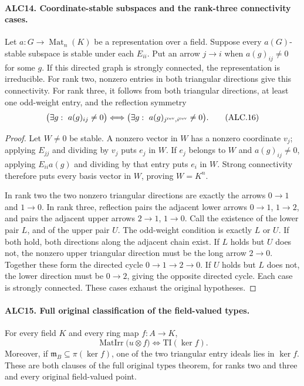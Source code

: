 \documentclass[11pt,a4paper]{article}
\numberwithin{equation}{section}
\theoremstyle{remark}\newtheorem{remark}[theorem]{Remark}
\begin{document}
\paragraph{ALC14. Coordinate-stable subspaces and the rank-three connectivity cases.}
\label{claim:ALC14}
Let \(a:G\to\operatorname{Mat}_n(K)\) be a representation
over a field.  Suppose every \(a(G)\)-stable subspace is
stable under each \(E_{ii}\).  Put an arrow \(j\to i\)
when \(a(g)_{ij}\ne0\) for some \(g\).  If this directed
graph is strongly connected, the representation is irreducible.
For rank two, nonzero entries in both triangular directions
give this connectivity.  For rank three, it follows from
both triangular directions, at least one odd-weight entry,
and the reflection symmetry
\[
 \bigl(\exists g:\ a(g)_{ij}\ne0\bigr)
 \Longleftrightarrow
 \bigl(\exists g:\ a(g)_{j^{\rm rev},i^{\rm rev}}\ne0\bigr).
                                                        \tag{ALC.16}
\]

\begin{proof}
Let \(W\ne0\) be stable.  A nonzero vector in \(W\) has
a nonzero coordinate \(v_j\); applying \(E_{jj}\) and
dividing by \(v_j\) puts \(e_j\) in \(W\).  If \(e_j\)
belongs to \(W\) and \(a(g)_{ij}\ne0\), applying
\(E_{ii}a(g)\) and dividing by that entry puts \(e_i\)
in \(W\).  Strong connectivity therefore puts every basis
vector in \(W\), proving \(W=K^n\).

In rank two the two nonzero triangular directions are exactly
the arrows \(0\to1\) and \(1\to0\).
In rank three, reflection pairs the adjacent lower arrows
\(0\to1\), \(1\to2\), and pairs the adjacent upper
arrows \(2\to1\), \(1\to0\).  Call the existence of
the lower pair \(L\), and of the upper pair \(U\).
The odd-weight condition is exactly \(L\) or \(U\).
If both hold, both directions along the adjacent chain exist.
If \(L\) holds but \(U\) does not, the nonzero upper
triangular direction must be the long arrow \(2\to0\).
Together these form the directed cycle
\(0\to1\to2\to0\).  If \(U\) holds but \(L\) does
not, the lower direction must be \(0\to2\), giving the
opposite directed cycle.  Each case is strongly connected.
These cases exhaust the original hypotheses.
\end{proof}

\paragraph{ALC15. Full original classification of the field-valued types.}
\label{claim:ALC15}
For every field \(K\) and every ring map \(f:A\to K\),
\[
 \operatorname{MatIrr}\bigl(u\otimes f\bigr)
       \Longleftrightarrow \mathrm{TI}(\ker f).
                                                        \tag{ALC.17}
\]
Moreover, if \(\mathfrak m_B\subseteq\pi(\ker f)\),
one of the two triangular entry ideals lies in \(\ker f\).
These are both clauses of the full original
\(\mathrm{types}\) theorem, for ranks two and three and
every original field-valued point.
\end{document}
